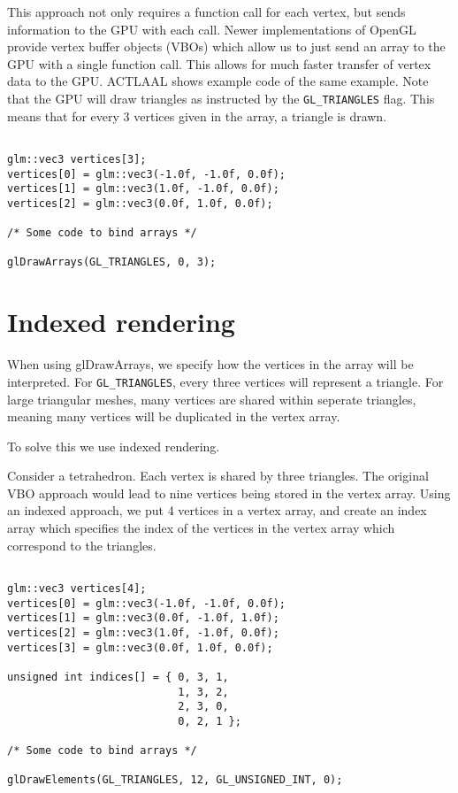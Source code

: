 This approach not only requires a function call for each vertex, but sends
information to the GPU with each call.  Newer implementations of OpenGL provide
vertex buffer objects (VBOs) which allow us to just send an array to the GPU
with a single function call.  This allows for much faster transfer of vertex
data to the GPU.  ACTLAAL shows example code of the same example.  Note that
the GPU will draw triangles as instructed by the \texttt{GL\_TRIANGLES} flag.  This
means that for every 3 vertices given in the array, a triangle is drawn.

\begin{verbatim}

glm::vec3 vertices[3];
vertices[0] = glm::vec3(-1.0f, -1.0f, 0.0f);
vertices[1] = glm::vec3(1.0f, -1.0f, 0.0f);
vertices[2] = glm::vec3(0.0f, 1.0f, 0.0f);

/* Some code to bind arrays */

glDrawArrays(GL_TRIANGLES, 0, 3);

\end{verbatim}

\section{Indexed rendering}

When using glDrawArrays, we specify how the vertices in the array will be
interpreted.  For \texttt{GL\_TRIANGLES}, every three vertices will represent a triangle.
For large triangular meshes, many vertices are shared within seperate triangles,
meaning many vertices will be duplicated in the vertex array.

To solve this we use indexed rendering.

Consider a tetrahedron.  Each vertex is shared by three triangles.  The original
VBO approach would lead to nine vertices being stored in the vertex array.
Using an indexed approach, we put 4 vertices in a vertex array, and create an
index array which specifies the index of the vertices in the vertex array which
correspond to the triangles.

\begin{verbatim}

glm::vec3 vertices[4];
vertices[0] = glm::vec3(-1.0f, -1.0f, 0.0f);
vertices[1] = glm::vec3(0.0f, -1.0f, 1.0f);
vertices[2] = glm::vec3(1.0f, -1.0f, 0.0f);
vertices[3] = glm::vec3(0.0f, 1.0f, 0.0f);

unsigned int indices[] = { 0, 3, 1,
                           1, 3, 2,
                           2, 3, 0,
                           0, 2, 1 };

/* Some code to bind arrays */

glDrawElements(GL_TRIANGLES, 12, GL_UNSIGNED_INT, 0);
\end{verbatim}

